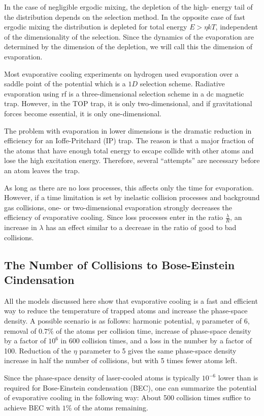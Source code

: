 \documentclass[12]{article}
\begin{document}
In the case of negligible ergodic mixing, the depletion of the high- energy tail of the distribution depends on the selection method. In the opposite case of fast ergodic mixing the distribution is depleted for total energy $E > \eta kT$, independent of the dimensionality of the selection. Since the dynamics of the evaporation are determined by the dimension of the depletion, we will call this the dimension of evaporation.        
       
 Most evaporative cooling experiments on hydrogen used evaporation over a saddle point of the potential which is a  $1D$ selection scheme. Radiative evaporation using rf is a three-dimensional selection scheme in a dc magnetic trap. However, in the TOP trap, it is only two-dimensional, and if gravitational forces become essential, it is only one-dimensional.
       
The problem with evaporation in lower dimensions is the dramatic reduction in efficiency for an Ioffe-Pritchard (IP) trap. The reason is that a major fraction of the atoms that have enough total energy to escape collide with other atoms and lose the high excitation energy. Therefore, several “attempts” are necessary before an atom leaves the trap.   
    
As long as there are no loss processes, this affects only the time for evaporation. However, if a time limitation is set by inelastic collision processes and background gas collisions, one- or two-dimensional evaporation strongly decreases the efficiency of evaporative cooling. Since loss processes enter in the ratio $\frac{\lambda}{R}$, an increase in $\lambda$ has an effect similar to a decrease in the ratio of good to bad collisions.
  \subsection{The Number of Collisions to Bose-Einstein Cindensation}
  All the models discussed here show that evaporative cooling is a fast and efficient way to reduce the temperature of trapped atoms and increase the phase-space density. A possible scenario is as follows: harmonic potential, $\eta$ parameter of 6, removal of $0.7\%$ of the atoms per collision time, increase of phase-space density by a factor of $10^6$ in 600 collision times, and a loss in the number by a factor of 100. Reduction of the $\eta$ parameter to 5 gives the same phase-space density increase in half the number of collisions, but with 5 times fewer atoms left.

Since the phase-space density of laser-cooled atoms is typically $10^{-6}$ lower than is required for Bose-Einstein condensation (BEC), one can summarize the potential of evaporative cooling in the following way: About 500 collision times suffice to achieve BEC with $1\%$ of the atoms remaining.
\end{document}
